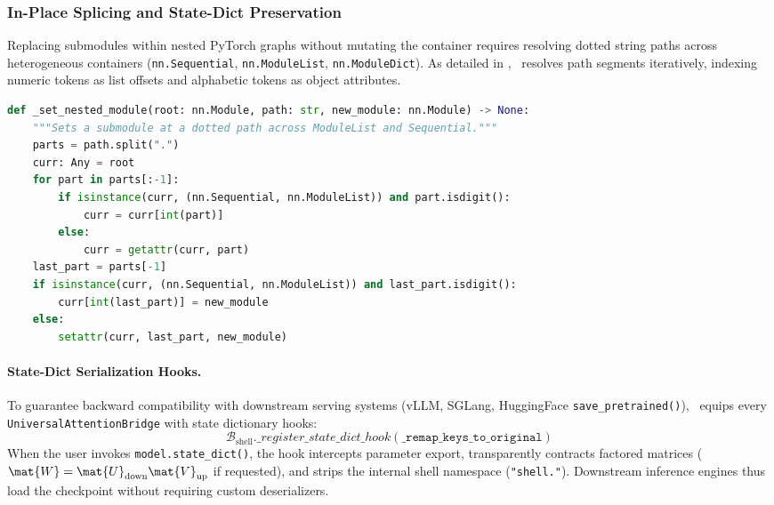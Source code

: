 \subsubsection{In-Place Splicing and State-Dict Preservation}
Replacing submodules within nested PyTorch graphs without mutating the container requires resolving dotted string paths across heterogeneous containers (\texttt{nn.Sequential}, \texttt{nn.ModuleList}, \texttt{nn.ModuleDict}). As detailed in , \neuralops\ resolves path segments iteratively, indexing numeric tokens as list offsets and alphabetic tokens as object attributes.

\begin{lstlisting}[language=Python, caption={In-place recursive module substitution across heterogeneous containers.}, label=lst:nested_traversal_sys]
def _set_nested_module(root: nn.Module, path: str, new_module: nn.Module) -> None:
    """Sets a submodule at a dotted path across ModuleList and Sequential."""
    parts = path.split(".")
    curr: Any = root
    for part in parts[:-1]:
        if isinstance(curr, (nn.Sequential, nn.ModuleList)) and part.isdigit():
            curr = curr[int(part)]
        else:
            curr = getattr(curr, part)
    last_part = parts[-1]
    if isinstance(curr, (nn.Sequential, nn.ModuleList)) and last_part.isdigit():
        curr[int(last_part)] = new_module
    else:
        setattr(curr, last_part, new_module)
\end{lstlisting}

\paragraph{State-Dict Serialization Hooks.} To guarantee backward compatibility with downstream serving systems (vLLM, SGLang, HuggingFace \texttt{save\_pretrained()}), \neuralops\ equips every \texttt{UniversalAttentionBridge} with state dictionary hooks:
\begin{equation}
    \mathcal{B}_{\text{shell}}.\_register\_state\_dict\_hook(\texttt{\_remap\_keys\_to\_original})
    \label{eq:state_dict_hook}
\end{equation}
When the user invokes \texttt{model.state\_dict()}, the hook intercepts parameter export, transparently contracts factored matrices ($\mat{W} = \mat{U}_{\text{down}} \mat{V}_{\text{up}}$ if requested), and strips the internal shell namespace (\texttt{"shell."}). Downstream inference engines thus load the checkpoint without requiring custom deserializers.

